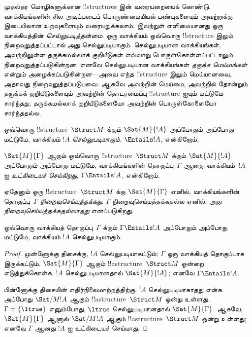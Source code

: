 \documentclass[../../../include/open-logic-section]{subfiles}
\begin{document}


\begin{explain}
முதல்தர மொழிகளுக்கான !!{structure}s இன் வரையறையைக் கொண்டு,
வாக்கியங்களின் சில அடிப்படைப் பொருண்மையியல் பண்புகளையும் அவற்றுக்கு
இடையிலான உறவுகளையும் வரையறுக்கலாம். இவற்றுள் எளிமையானது ஒரு வாக்கியத்தின்
\emph{செல்லுபடித்தன்மை}. ஒரு வாக்கியம் ஒவ்வொரு !!{structure} இலும்
நிறைவுறுத்தப்பட்டால் அது செல்லுபடியாகும். செல்லுபடியான வாக்கியங்கள்,
அவற்றிலுள்ள தருக்கமல்லாக் குறியீடுகள் எவ்வாறு பொருள்கொள்ளப்பட்டாலும்
நிறைவுறுத்தப்படுகின்றன. எனவே செல்லுபடியான வாக்கியங்கள்
\emph{தருக்க மெய்மங்கள்} என்றும் அழைக்கப்படுகின்றன---அவை எந்த
!!{structure} இலும் மெய்யானவை, அதாவது நிறைவுறுத்தப்படுபவை. ஆகவே அவற்றின்
மெய்மை, அவற்றில் தோன்றும் தருக்கக் குறியீடுகளையும் அவற்றின் தொடரமைப்பு
!!{structure} ஐயும் மட்டுமே சார்ந்தது; தருக்கமல்லாக் குறியீடுகளையோ
அவற்றின் பொருள்கோளையோ சார்ந்ததல்ல.
\end{explain}

\begin{defn}[செல்லுபடித்தன்மை]
ஒவ்வொரு !!{structure}~$\Struct M$ க்கும் $\Sat{M}{!A}$ அப்போதும் அப்போது மட்டுமே, வாக்கியம்
$!A$ \emph{செல்லுபடியாகும்}, $\Entails !A$, என்கிறோம்.
\end{defn}

\begin{defn}[உட்கிடை]
$\Sat{M}{\Gamma}$ ஆகும் ஒவ்வொரு !!{structure}~$\Struct M$ க்கும்
$\Sat{M}{!A}$ அப்போதும் அப்போது மட்டுமே, வாக்கியங்களின் தொகுப்பு~$\Gamma$ ஆனது
வாக்கியம்~$!A$ ஐ \emph{உட்கிடையச் செய்கிறது}, $\Gamma
\Entails !A$, என்கிறோம்.
\end{defn}


\begin{defn}[நிறைவுசெய்யத்தக்க தன்மை]
ஏதேனும் ஒரு !!{structure}~$\Struct M$ க்கு $\Sat{M}{\Gamma}$ எனில்,
வாக்கியங்களின் தொகுப்பு~$\Gamma$ \emph{நிறைவுசெய்யத்தக்கது}.
$\Gamma$ நிறைவுசெய்யத்தக்கதல்ல எனில், அது
\emph{நிறைவுசெய்யத்தக்கதல்லாதது} எனப்படுகிறது.
\end{defn}

\begin{prop}
ஒவ்வொரு வாக்கியத் தொகுப்பு~$\Gamma$ க்கும்
$\Gamma \Entails !A$ அப்போதும் அப்போது மட்டுமே, வாக்கியம் $!A$ செல்லுபடியாகும்.
\end{prop}

\begin{proof}
முன்னோக்கு திசைக்கு, $!A$ செல்லுபடியாகட்டும்; $\Gamma$ ஒரு வாக்கியத்
தொகுப்பாக இருக்கட்டும். $\Sat{M}{\Gamma}$ ஆகும்
!!a{structure}~$\Struct M$ ஒன்றை எடுத்துக்கொள்க. $!A$ செல்லுபடியானதால்
$\Sat{M}{!A}$; எனவே $\Gamma \Entails !A$.

பின்னோக்கு திசையின் எதிர்நிலைமாற்றத்திற்கு, $!A$ செல்லுபடியாகாதது என்க.
அப்போது $\Sat/{M}{!A}$ ஆகும் !!a{structure}~$\Struct M$ ஒன்று உள்ளது.
$\Gamma = \{ \ltrue \}$ எனும்போது, $\ltrue$ செல்லுபடியானதால்
$\Sat{M}{\Gamma}$. ஆகவே, $\Sat{M}{\Gamma}$ ஆனால் $\Sat/{M}{!A}$ ஆகும்
!!a{structure}~$\Struct M$ ஒன்று உள்ளது; எனவே $\Gamma$ ஆனது $!A$ ஐ
உட்கிடையச் செய்யாது.
\end{proof}
\end{document}
